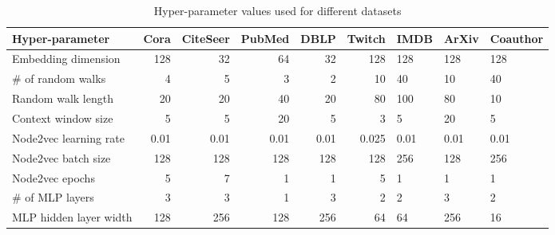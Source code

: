 \begin{table}
  \caption{Hyper-parameter values used for different datasets}
  \label{tab:hyperparameter-values}
  \centering
  \begin{tabular}{lrrrrr}
    \toprule
    \textbf{Hyper-parameter} & \textbf{Cora} & \textbf{CiteSeer} & \textbf{PubMed} & \textbf{DBLP} & \textbf{Twitch} & \textbf{IMDB} & \textbf{ArXiv} & \textbf{Coauthor} \\
    \midrule
    Embedding dimension      & 128           & 32                & 64              & 32            & 128             & 128           & 128            & 128               \\
    \# of random walks       & 4             & 5                 & 3               & 2             & 10              & 40            & 10             & 40                \\
    Random walk length       & 20            & 20                & 40              & 20            & 80              & 100           & 80             & 10                \\
    Context window size      & 5             & 5                 & 20              & 5             & 3               & 5             & 20             & 5                 \\
    Node2vec learning rate   & 0.01          & 0.01              & 0.01            & 0.01          & 0.025           & 0.01          & 0.01           & 0.01              \\
    Node2vec batch size      & 128           & 128               & 128             & 128           & 128             & 256           & 128            & 256               \\
    Node2vec epochs          & 5             & 7                 & 1               & 1             & 5               & 1             & 1              & 1                 \\
    \# of MLP layers         & 3             & 3                 & 1               & 3             & 2               & 2             & 3              & 2                 \\
    MLP hidden layer width   & 128           & 256               & 128             & 256           & 64              & 64            & 256            & 16                \\

\end{tabular}
\end{table}
